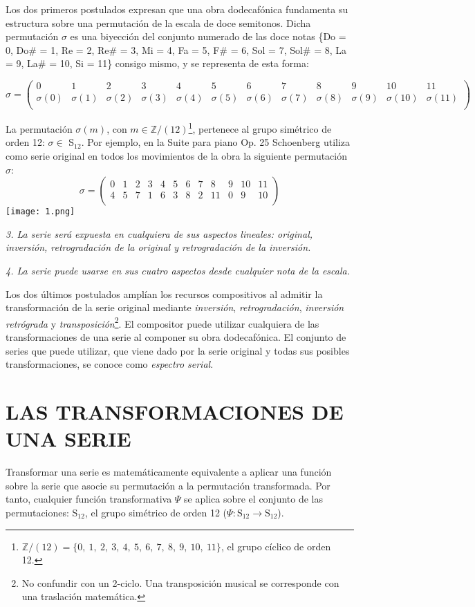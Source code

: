 		Los dos primeros postulados expresan que una obra dodecafónica fundamenta su estructura sobre una permutación de la escala de doce semitonos. Dicha permutación $\sigma$ es una biyección del conjunto numerado de las doce notas \{Do = 0, Do\# = 1, Re = 2, Re\# = 3, Mi = 4, Fa = 5, F\# = 6, Sol = 7, Sol\# = 8, La = 9, La\# = 10, Si = 11\} consigo mismo, y se representa de esta forma:
		\begin{footnotesize}
			$$
			\sigma=\left(\begin{matrix}0&1&2&3&4&5&6&7&8&9&10&11\\\sigma(0)&\sigma(1)&\sigma(2)&\sigma(3)&\sigma(4)&\sigma(5)&\sigma(6)&\sigma(7)&\sigma(8)&\sigma(9)&\sigma(10)&\sigma(11)\\\end{matrix}\right)
			$$
		\end{footnotesize}	
		La permutación $\sigma(m)$, con $m\in \mathbb{Z} / (12)$\footnote{$\mathbb{Z} / (12)=\{0,\ 1,\ 2,\ 3,\ 4,\ 5,\ 6,\ 7,\ 8,\ 9,\ 10,\ 11\}$, el grupo cíclico de orden 12.}, pertenece al grupo simétrico de orden 12: $\sigma\in$ S$_{12}$. Por ejemplo, en la Suite para piano Op. 25 Schoenberg utiliza como serie original en todos los movimientos de la obra la siguiente permutación $\sigma$:
		$$\sigma=\left(\begin{matrix}0&1&2&3&4&5&6&7&8&9&10&11\\4&5&7&1&6&3&8&2&11&0&9&10\\\end{matrix}\right)$$	
		\texttt{[image: 1.png]}
		
		\emph{3. La serie será expuesta en cualquiera de sus aspectos lineales: original, inversión, retrogradación de la original y retrogradación de la inversión.}
		 
		\emph{4. La serie puede usarse en sus cuatro aspectos desde cualquier nota de la escala.}
		
		Los dos últimos postulados amplían los recursos compositivos al admitir la transformación de la serie original mediante \emph{inversión}, \emph{retrogradación}, \emph{inversión retrógrada} y \emph{transposición}\footnote{No confundir con un 2-ciclo. Una transposición musical se corresponde con una traslación matemática.}. El compositor puede utilizar cualquiera de las transformaciones de una serie al componer su obra dodecafónica. El conjunto de series que puede utilizar, que viene dado por la serie original y todas sus posibles transformaciones, se conoce como \emph{espectro serial}.
		
	\section{LAS TRANSFORMACIONES DE UNA SERIE}
		\label{transPsi}
		Transformar una serie es matemáticamente equivalente a aplicar una función sobre la serie que asocie su permutación a la permutación transformada. Por tanto, cualquier función transformativa $\Psi$ se aplica sobre el conjunto de las permutaciones: S$_{12}$, el grupo simétrico de orden 12 ($\Psi:\text{S}_{12}\rightarrow\text{S}_{12}$).
		
